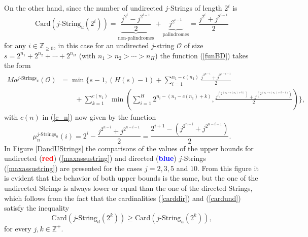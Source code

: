 \documentclass[letterpaper,12pt]{article}
\theoremstyle{definition}
\begin{document}
On the other hand, since the number of undirected $j$-Strings of length $2^i$ is 
\begin{equation}\label{cardund}
         \text{Card}(j\text{-String}_u(2^i)) =\underbrace{\frac{j^{2^i}-j^{2^{i-1}}}{2}}_{\text{non-palindromes}}+\underbrace{j^{2^{i-1}}}_{\text{palindromes}} = \frac{j^{2^i}+j^{2^{i-1}}}{2}
\end{equation}
for any $i \in \mathbb{Z}_{\geq 0}$, in this case for an undirected $j$-string $\mathscr{O}$ of size $s=2^{n_1}+2^{n_2}+\cdots + 2^{n_H}$ (with $n_1>n_2>\cdots > n_H$) the function (\ref{funBD}) takes the form 
\begin{equation}\label{maxassustring}
\begin{split}
    Ma^{j\text{-Strings}_u}(\mathscr{O})  & = \min \bigg\{ s-1 ,(H(s)-1)  +\sum_{i=1}^{n_1-c(n_1)} \frac{j^{2^{n-i}}+j^{2^{n-i-1}}}{2} \\
    & \qquad + \sum_{k=1}^{c(n_1)} \min \left( \sum_{i=1}^{H} 2^{n_i-(n_1-c(n_1)+k)}, \frac{j^{(2^{(n_1-c(n_1)+k)})}+j^{(2^{(n_1-c(n_1)+k-1)})}}{2} \right) \bigg\},
\end{split}
\end{equation}
with $c(n)$ in (\ref{c_n}) now given by the function
\begin{equation}
    \mu^{j\text{-Strings}_u}_n(i)=2^{i}-\frac{j^{2^{n-i}}+j^{2^{n-i-1}}}{2} = \frac{2^{i+1}-(j^{2^{n-i}}+j^{2^{n-i-1}})}{2}.
\end{equation}
In Figure \ref{DandUStrings} the comparisons of the values of the upper bounds for undirected (\textbf{\textcolor{red}{red}}) (\ref{maxassustring}) and directed (\textbf{\textcolor{blue}{blue}}) $j$-Strings (\ref{maxassustring}) are presented for the cases $j=2,3,5$ and $10$. From this figure it is evident that the  behavior of both upper bounds is the same, but the one of the undirected Strings is always lower or equal than the one of the directed Strings, which follows from the fact that the cardinalities (\ref{carddir}) and (\ref{cardund}) satisfy the inequality
\begin{equation*}
   \text{Card}(j\text{-String}_d(2^k)) \geq  \text{Card}(j\text{-String}_u(2^k)),
\end{equation*}
for every $j,k \in \mathbb{Z}^+$.
\end{document}
